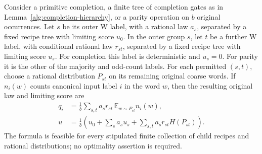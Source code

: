 \begin{proposition}
\label{alg:recipe-composition}
Consider a primitive completion, a finite tree of completion gates as in
Lemma~\ref{alg:completion-hierarchy}, or a parity operation on \(b\)
original occurrences.
Let \(s\) be its outer W label, with a rational law \(a_s\), separated
by a fixed recipe tree with limiting score \(u_0\).  In the outer group \(s\),
let \(t\) be a further W label, with conditional rational law \(r_{st}\),
separated by a fixed recipe tree with limiting score \(u_s\).
For completion this label is deterministic and \(u_s=0\).
For parity it is the other of the majority and odd-count labels.
For each permitted \((s,t)\), choose a rational distribution \(P_{st}\)
on its remaining original coarse words.  If \(n_i(w)\) counts canonical
input label \(i\) in the word \(w\), then the resulting original law and
limiting score are
\begin{align}
 q_i&=\frac1b\sum_{s,t}a_s r_{st}\,
                   \mathbb E_{w\sim P_{st}}n_i(w),
       \label{alg:recipe-law}\\
 u&=\frac1b\left(u_0+\sum_s a_su_s
                     +\sum_{s,t}a_s r_{st}H(P_{st})\right).
       \label{alg:recipe-score}
\end{align}
The formula is feasible for every stipulated finite collection of child
recipes and rational distributions; no optimality assertion is required.
\end{proposition}
